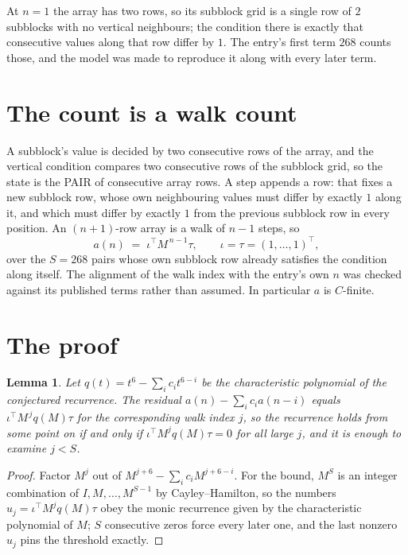 \documentclass[11pt,a4paper]{article}
\theoremstyle{plain}
\newtheorem{lemma}[theorem]{Lemma}
\theoremstyle{definition}
\begin{document}
At $n=1$ the array has two rows, so its subblock grid is a single row of $2$ subblocks with
no vertical neighbours; the condition there is exactly that consecutive values along that row
differ by $1$. The entry's first term $268$ counts those, and the model was made to
reproduce it along with every later term.

\section{The count is a walk count}

A subblock's value is decided by two consecutive rows of the array, and the
vertical condition compares two consecutive rows of the subblock grid, so the state is the
PAIR of consecutive array rows. A step appends a row: that fixes a new subblock row, whose own
neighbouring values must differ by exactly $1$ along it, and which must differ by exactly
$1$ from the previous subblock row in every position. An $(n+1)$-row array is a walk of
$n-1$ steps, so
\[
a(n)\;=\;\iota^{\!\top}M^{\,n-1}\tau,\qquad\iota=\tau=(1,\dots,1)^{\!\top},
\]
over the $S=268$ pairs whose own subblock row already satisfies the condition along itself.
The alignment of the walk index with the entry's own $n$ was checked against its published
terms rather than assumed. In particular $a$ is $C$-finite.

\section{The proof}

\begin{lemma}\label{lem:crit}
Let $q(t)=t^{6}-\sum_i c_it^{6-i}$ be the characteristic polynomial of the
conjectured recurrence. The residual $a(n)-\sum_ic_ia(n-i)$ equals
$\iota^{\!\top}M^{\,j}q(M)\tau$ for the corresponding walk index $j$, so the recurrence
holds from some point on if and only if $\iota^{\!\top}M^{j}q(M)\tau=0$ for all large $j$,
and it is enough to examine $j<S$.
\end{lemma}

\begin{proof}
Factor $M^{j}$ out of $M^{j+6}-\sum_ic_iM^{j+6-i}$. For the bound, $M^{S}$
is an integer combination of $I,M,\dots,M^{S-1}$ by Cayley--Hamilton, so the numbers
$u_j=\iota^{\!\top}M^{j}q(M)\tau$ obey the monic recurrence given by the characteristic
polynomial of $M$; $S$ consecutive zeros force every later one, and the last nonzero $u_j$
pins the threshold exactly.
\end{proof}
\end{document}
